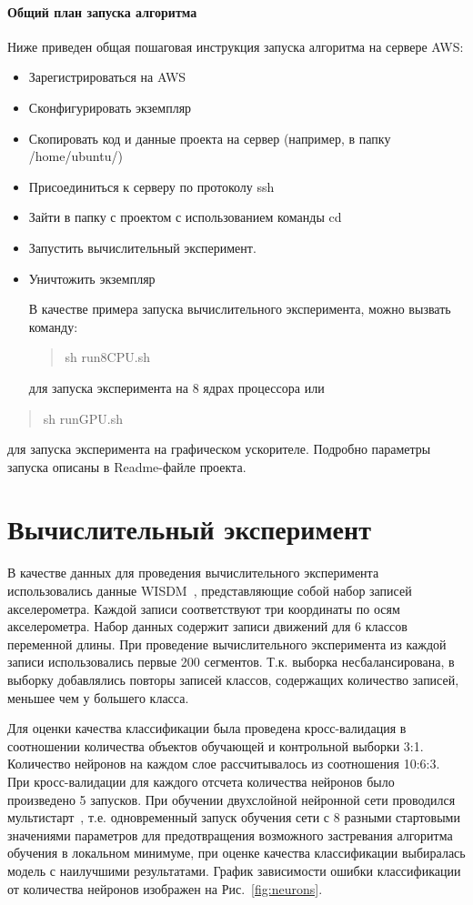 \documentclass[12pt,twoside]{article}
\begin{document}
\paragraph{Общий план запуска алгоритма}
Ниже приведен общая пошаговая инструкция запуска алгоритма на сервере AWS:
\begin{itemize}
\item Зарегистрироваться на AWS
\item Сконфигурировать экземпляр
\item Скопировать код и данные проекта на сервер (например, в папку /home/ubuntu/)
\item Присоединиться к серверу по протоколу ssh
\item Зайти в папку с проектом с использованием команды cd
\item Запустить вычислительный эксперимент.
\item Уничтожить экземпляр

В качестве примера запуска вычислительного эксперимента, можно вызвать команду:
\begin{quote}
sh run8CPU.sh
\end{quote}
для запуска эксперимента на 8 ядрах процессора или
\end{itemize}
\begin{quote}
sh runGPU.sh
\end{quote}
для запуска эксперимента на графическом ускорителе. Подробно параметры запуска описаны в Readme-файле проекта.
\section{Вычислительный эксперимент}
В качестве данных для проведения вычислительного эксперимента использовались данные WISDM~\cite{wisdm}, представляющие собой набор записей акселерометра. Каждой записи соответствуют три координаты по осям акселерометра. Набор данных содержит записи движений для 6 классов переменной длины.
При проведение вычислительного эксперимента из каждой записи использовались первые 200 сегментов. Т.к. выборка несбалансирована, в выборку добавлялись повторы записей классов, содержащих количество записей, меньшее чем у большего класса.

Для оценки качества классификации была проведена кросс-валидация в соотношении количества объектов обучающей и контрольной выборки 3:1. Количество нейронов на каждом слое рассчитывалось из соотношения 10:6:3. При кросс-валидации для каждого отсчета количества нейронов было произведено 5 запусков. При обучении двухслойной нейронной сети проводился мультистарт~\cite{multi}, т.е. одновременный запуск обучения сети с 8 разными стартовыми значениями параметров для предотвращения возможного застревания алгоритма обучения в локальном минимуме, при оценке качества классификации выбиралась модель с наилучшими результатами. График зависимости ошибки классификации от количества нейронов изображен на Рис.~\ref{fig:neurons}.
\end{document}
